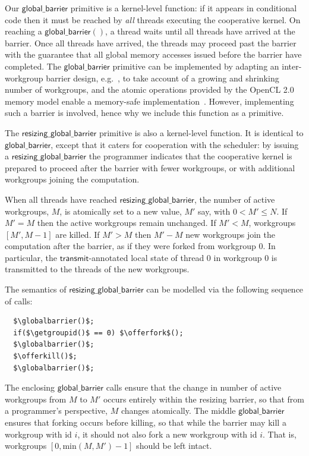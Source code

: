 \documentclass[numbers,nocopyrightspace,10pt]{sigplanconf}
\newcommand{\transmit}{\mathsf{transmit}}
\newcommand{\offerfork}{\mathsf{offer\_fork}}
\newcommand{\offerkill}{\mathsf{offer\_kill}}
\newcommand{\globalbarrier}{\mathsf{global\_barrier}}
\newcommand{\resizingglobalbarrier}{\mathsf{resizing\_global\_barrier}}
\newcommand{\getgroupid}{\mathsf{get\_group\_id}}
\begin{document}
Our $\globalbarrier$ primitive is a kernel-level function: if it
appears in conditional code then it must be reached by \emph{all}
threads executing the cooperative kernel.  On reaching a
$\globalbarrier()$, a thread waits until all threads have arrived at
the barrier.  Once all threads have arrived, the threads may proceed
past the barrier with the guarantee that all global memory accesses
issued before the barrier have completed.  The $\globalbarrier$
primitive can be implemented by adapting an inter-workgroup barrier
design, e.g.~\cite{XF10}, to take account of a growing and shrinking number of workgroups, and the atomic operations provided by
the OpenCL 2.0 memory model enable a memory-safe
implementation~\cite{DBLP:conf/oopsla/SorensenDBGR16}.  However, implementing such a barrier is
involved, hence why we include this function as a primitive.

The $\resizingglobalbarrier$ primitive is also a kernel-level
function.  It is identical to $\globalbarrier$, except that it caters
for cooperation with the scheduler: by issuing a
$\resizingglobalbarrier$ the programmer indicates that the cooperative
kernel is prepared to proceed after the barrier with fewer workgroups,
or with additional workgroups joining the computation.

When all threads have reached $\resizingglobalbarrier$,
the number of active workgroups, $M$, is atomically set to a new value, $M'$ say, with $0 < M' \leq N$.
If $M' = M$ then the active workgroups remain unchanged.  If $M' < M$, workgroups $[M', M-1]$ are
killed.  If $M' > M$ then $M'-M$ new workgroups join the computation after the barrier,
as if they were forked from workgroup 0.  In particular, the
$\transmit$-annotated local state of thread 0 in workgroup 0 is
transmitted to the threads of the new workgroups.

The semantics of $\resizingglobalbarrier$ can be modelled via the following sequence of calls:

\lstset{basicstyle=\tt,numbers=none}
\begin{lstlisting}
  $\globalbarrier()$;
  if($\getgroupid()$ == 0) $\offerfork$();
  $\globalbarrier()$;
  $\offerkill()$;
  $\globalbarrier()$;
\end{lstlisting}
\lstset{basicstyle=\scriptsize\tt,numbers=left}

The enclosing $\globalbarrier$ calls ensure that the change in number
of active workgroups from $M$ to $M'$ occurs entirely within the
resizing barrier, so that from a programmer's perspective, $M$ changes atomically.  The middle $\globalbarrier$ ensures that forking occurs before killing, so that while the barrier may kill a workgroup with id $i$, it should not also fork a new workgroup with id $i$.  That is, workgroups $[0, \textrm{min}(M, M') - 1]$ should be left intact.
\end{document}
